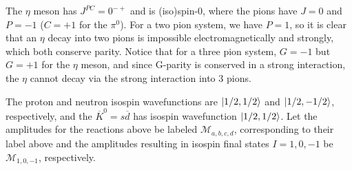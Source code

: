 
The $\eta$ meson has $J^{PC} = 0^{-+}$ and is (iso)spin-0, where the pions have $J = 0$ and $P = -1$ ($C = +1$ for the $\pi^{0}$).
For a two pion system, we have $P = 1$, so it is clear that an $\eta$ decay into two pions is impossible electromagnetically and strongly, which both conserve parity.
Notice that for a three pion system, $G = -1$ but $G = +1$ for the $\eta$ meson, and since G-parity is conserved in a strong interaction, the $\eta$ cannot decay via the strong interaction into $3$ pions.




The proton and neutron isospin wavefunctions are $\ket{1/2,1/2}$ and $\ket{1/2,-1/2}$, respectively, and the $\overline{K}^{0} = s\overline{d}$ has isospin wavefunction $\ket{1/2,1/2}$.
Let the amplitudes for the reactions above be labeled $\mathcal{M}_{a,b,c,d}$, corresponding to their label above and the amplitudes resulting in isospin final states $I = 1,0,-1$ be $\mathcal{M}_{1,0,-1}$, respectively.

